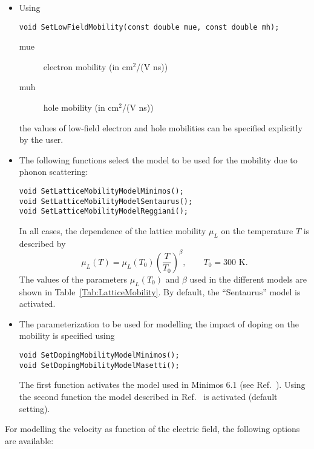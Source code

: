 \begin{itemize}
  \item
  Using 
  \begin{lstlisting}
void SetLowFieldMobility(const double mue, const double mh);
  \end{lstlisting}
  \begin{description}
    \item[mue] electron mobility (in cm\(^{2}\)/(V ns))
    \item[muh] hole mobility (in cm\(^{2}\)/(V ns))
  \end{description}
  the values of low-field electron and hole mobilities
  can be specified explicitly by the user.
  \item
  The following functions select the model to be used for the 
  mobility due to phonon scattering:
  \begin{lstlisting}
void SetLatticeMobilityModelMinimos();
void SetLatticeMobilityModelSentaurus();
void SetLatticeMobilityModelReggiani();
  \end{lstlisting} 
  In all cases, the dependence of the lattice mobility \(\mu_{L}\) 
  on the temperature \(T\) is described by 
  \begin{equation*}
    \mu_{L}\left(T\right) = \mu_{L}\left(T_{0}\right) 
              \left(\frac{T}{T_{0}}\right)^{\beta}, \qquad T_{0} = 300\text{ K}.
  \end{equation*}
  The values of the parameters \(\mu_{L}\left(T_{0}\right)\) and \(\beta\) 
  used in the different models are shown in Table~\ref{Tab:LatticeMobility}. 
  By default, the ``Sentaurus'' model is activated. 
  \item
  The parameterization to be used for modelling the impact of 
  doping on the mobility is specified using
  \begin{lstlisting}
void SetDopingMobilityModelMinimos();
void SetDopingMobilityModelMasetti();
  \end{lstlisting}
  The first function activates the model used in Minimos 6.1 
  (see Ref.~\cite{Haensch1990}). Using the second function the 
  model described in Ref.~\cite{Masetti1983} is activated (default setting).  
\end{itemize}
For modelling the velocity as function of the electric field, 
the following options are available:
